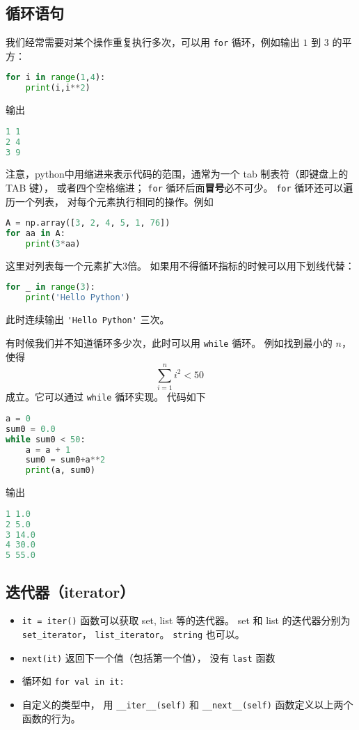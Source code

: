 \subsection{循环语句}
我们经常需要对某个操作重复执行多次，可以用 \verb|for| 循环，例如输出 $1$ 到 $3$ 的平方：
\begin{lstlisting}[language=python]
for i in range(1,4):
    print(i,i**2)
\end{lstlisting}
输出
\begin{lstlisting}[language=python]
1 1
2 4
3 9
\end{lstlisting}
注意，python中用缩进来表示代码的范围，通常为一个 tab 制表符（即键盘上的 TAB 键）， 或者四个空格缩进； \verb|for| 循环后面\textbf{冒号}必不可少。 \verb|for| 循环还可以遍历一个列表， 对每个元素执行相同的操作。例如
\begin{lstlisting}[language=python]
A = np.array([3, 2, 4, 5, 1, 76])
for aa in A:
    print(3*aa)
\end{lstlisting}
这里对列表每一个元素扩大3倍。 如果用不得循环指标的时候可以用下划线代替：
\begin{lstlisting}[language=python]
for _ in range(3):
    print('Hello Python')
\end{lstlisting}
此时连续输出   \verb|'Hello Python'|  三次。

有时候我们并不知道循环多少次，此时可以用 \verb|while| 循环。 例如找到最小的 $n$，使得
\begin{equation}
\sum_{i=1}^n i^2<50~
\end{equation}
成立。它可以通过 \verb|while| 循环实现。 代码如下
\begin{lstlisting}[language=python]
a = 0
sum0 = 0.0
while sum0 < 50:
    a = a + 1
    sum0 = sum0+a**2
    print(a, sum0)
\end{lstlisting}
输出
\begin{lstlisting}[language=python]
1 1.0
2 5.0
3 14.0
4 30.0
5 55.0
\end{lstlisting}

\subsection{迭代器（iterator）}
\begin{itemize}
\item \verb|it = iter()| 函数可以获取 set, list 等的迭代器。 set 和 list 的迭代器分别为 \verb|set_iterator|， \verb|list_iterator|。 \verb|string| 也可以。
\item \verb|next(it)| 返回下一个值（包括第一个值）， 没有 \verb|last| 函数
\item 循环如 \verb|for val in it:|
\item 自定义的类型中， 用 \verb|__iter__(self)| 和 \verb|__next__(self)| 函数定义以上两个函数的行为。
\end{itemize}

